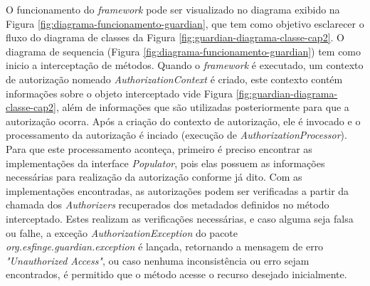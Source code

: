 \par O funcionamento do \textit{framework} pode ser visualizado no diagrama exibido na Figura \ref{fig:diagrama-funcionamento-guardian}, que tem como objetivo esclarecer o fluxo do diagrama de classes da Figura \ref{fig:guardian-diagrama-classe-cap2}. O diagrama de sequencia (Figura \ref{fig:diagrama-funcionamento-guardian}) tem como inicio a interceptação de métodos. Quando o \textit{framework} é executado, um contexto de autorização nomeado \textit{AuthorizationContext} é criado, este contexto contém informações sobre o objeto interceptado vide Figura \ref{fig:guardian-diagrama-classe-cap2}, além de informações que são utilizadas posteriormente para que a autorização ocorra. Após a criação do contexto de autorização, ele é invocado e o processamento da autorização é inciado (execução de \textit{AuthorizationProcessor}). Para que este processamento aconteça, primeiro é preciso encontrar as implementações da interface \textit{Populator}, pois elas possuem as informações necessárias para realização da autorização conforme já dito. Com as implementações encontradas, as autorizações podem ser verificadas a partir da chamada dos \textit{Authorizers} recuperados dos metadados definidos no método interceptado. Estes realizam as verificações necessárias, e caso alguma seja falsa ou falhe, a exceção \textit{AuthorizationException} do pacote \textit{org.esfinge.guardian.exception} é lançada, retornando a mensagem de erro \textit{"Unauthorized Access"}, ou caso nenhuma inconsistência ou erro sejam encontrados, é permitido que o método acesse o recurso desejado inicialmente.

